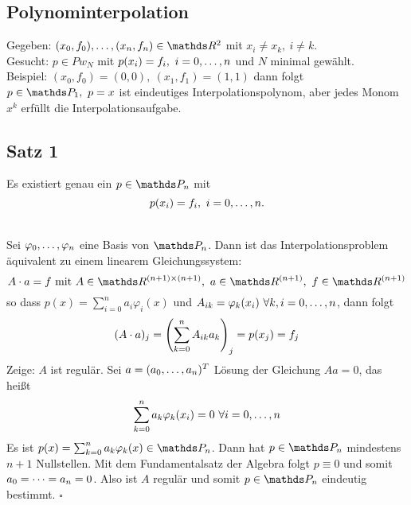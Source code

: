 \subsection{Polynominterpolation}
\label{sub:polynominterpolation}
Gegeben: $(x_0,f_0)\dt{,}(x_n,f_n)\in \R^2$ mit $x_i\neq x_k,~i\neq k$.\\
Gesucht: $p\in Pw_N$ mit $p(x_i)=f_i,~i=0, \dots ,n$ und $N$ minimal gewählt.\\
Beispiel: $(x_0,f_0)=(0,0),~(x_1,f_1)=(1,1)$ dann folgt $p\in\Pw_1,~p=x$ ist eindeutiges Interpolationspolynom, aber jedes Monom $x^k$ erfüllt die Interpolationsaufgabe.

\subsection{Satz 1}
\label{sub:satz_1}
Es existiert genau ein $p\in \Pw_n$ mit 
\[
p(x_i)=f_i,~i=0, \dots ,n.
\]

\\
Sei $\varphi_0, \dots ,\varphi_n$ eine Basis von $\Pw_n$.
Dann ist das Interpolationsproblem äquivalent zu einem linearem Gleichungssystem:
\[
A\cdot a=f \text{ mit }A\in \R^{(n+1)\times(n+1)},~a\in \R^{(n+1)},~f\in \R^{(n+1)}
\]
so dass $p(x)=\sum_{i=0}^{n}a_i\varphi_i(x)$ und $A_{ik}=\varphi_k(x_i)~\forall k,i=0, \dots ,n$, dann folgt
\[
(A\cdot a)_j=\left( \sum_{k=0}^{n}A_{ik}a_k\right)_j=p(x_j)=f_j
\]
Zeige: $A$ ist regulär.
Sei $a=(a_0, \dots ,a_n)^T$ Lösung der Gleichung $Aa=0$, das heißt
\[
\sum_{k=0}^{n}a_k\varphi_k(x_i)=0~\forall i=0, \dots ,n
\]
Es ist $p(x)=\sum_{k=0}^{n}a_k\varphi_k(x)\in \Pw_n$.
Dann hat $p\in \Pw_n$ mindestens $n+1$ Nullstellen.
Mit dem Fundamentalsatz der Algebra folgt $p\equiv 0$ und somit $a_0= \dots =a_n=0$.
Also ist $A$ regulär und somit $p\in \Pw_n$ eindeutig bestimmt.
\hfill $\square$

